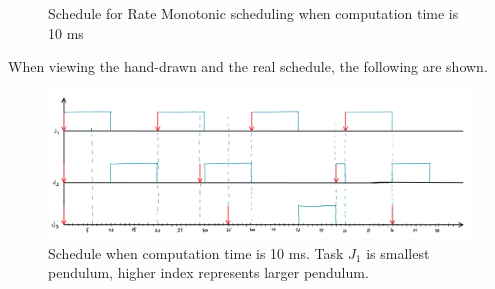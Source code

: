 \documentclass[10pt, a4paper]{article}
\begin{document}
{\begin{figure}[H]
        \caption{Schedule for Rate Monotonic scheduling when computation time is
        10 ms}
        \label{fig:Task_5_sch_10ms}
    \end{figure}
    When viewing the hand-drawn and the real schedule, the following are shown.
    \begin{figure}[H]
        \centering
        \includegraphics[width=1\linewidth]{../Matlab/HW2_sources_Windows64bit/images/rm_tasks_10ms.PNG}
        \caption{Schedule when computation time is 10 ms. Task $J_1$ is smallest
        pendulum, higher index represents larger pendulum.}
        \label{fig:Task_5_rm_performance_hand}
    \end{figure}

}
\end{document}
